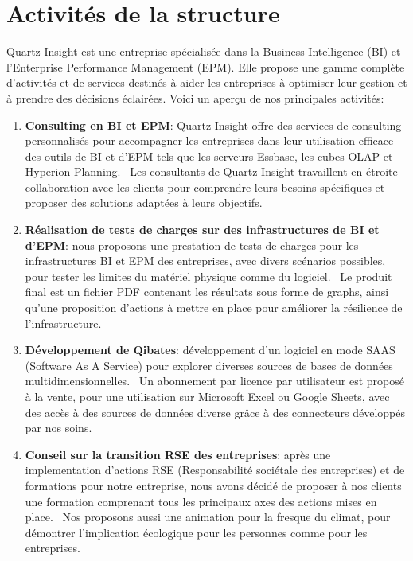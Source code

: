 \documentclass[a4paper, 11pt]{report}
\begin{document}
\section{Activités de la structure}
Quartz-Insight est une entreprise spécialisée dans la Business Intelligence (BI) et l'Enterprise Performance Management (EPM).
Elle propose une gamme complète d'activités et de services destinés à aider les entreprises à optimiser leur gestion et à prendre des décisions éclairées. Voici un aperçu de nos principales activités:
\begin{enumerate}
  \item \textbf{Consulting en BI et EPM}: Quartz-Insight offre des services de consulting personnalisés pour accompagner les entreprises dans leur utilisation efficace des outils de BI et d'EPM tels que les serveurs Essbase, les cubes OLAP et Hyperion Planning.
    \ Les consultants de Quartz-Insight travaillent en étroite collaboration avec les clients pour comprendre leurs besoins spécifiques et proposer des solutions adaptées à leurs objectifs.
  \item \textbf{Réalisation de tests de charges sur des infrastructures de BI et d’EPM}: nous proposons une prestation de tests de charges pour les infrastructures BI et EPM des entreprises, avec divers scénarios possibles, pour tester les limites du matériel physique comme du logiciel.
    \ Le produit final est un fichier PDF contenant les résultats sous forme de graphs, ainsi qu’une proposition d’actions à mettre en place pour améliorer la résilience de l’infrastructure.
  \item \textbf{Développement de Qibates}: développement d’un logiciel en mode SAAS (Software As A Service) pour explorer diverses sources de bases de données multidimensionnelles.
    \ Un abonnement par licence par utilisateur est proposé à la vente, pour une utilisation sur Microsoft Excel ou Google Sheets, avec des accès à des sources de données diverse grâce à des connecteurs développés par nos soins. 
  \item \textbf{Conseil sur la transition RSE des entreprises}: après une implementation d’actions RSE (Responsabilité sociétale des entreprises) et de formations pour notre entreprise, nous avons décidé de proposer à nos clients une formation comprenant tous les principaux axes des actions mises en place.
    \ Nos proposons aussi une animation pour la fresque du climat, pour démontrer l’implication écologique pour les personnes comme pour les entreprises.
\end{enumerate}
\end{document}
